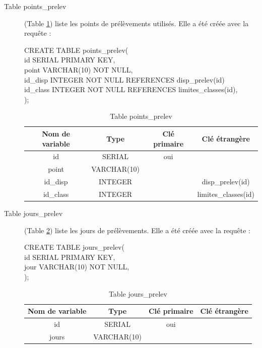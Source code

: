 \documentclass[12pt,a4paper,oneside]{article}
\begin{document}
\begin{description}
\item[Table points\_prelev] (Table \ref{points}) liste les points de prélèvements utilisés. Elle a été créée avec la requête :
\begin{tabbing}
CREATE TABLE points\_prelev(\\
id SERIAL PRIMARY KEY,\\
point VARCHAR(10) NOT NULL,\\
id\_disp INTEGER NOT NULL REFERENCES disp\_prelev(id)\\
id\_class INTEGER NOT NULL REFERENCES limites\_classes(id),\\
);
\end{tabbing}
\begin{table}
\caption{Table points\_prelev \label{points}}
\begin{center}
\begin{tabular}{|c|c|c|c|}
	\hline
	\textbf{Nom de variable} & \textbf{Type} & \textbf{Clé primaire} & \textbf{Clé étrangère}\\
	\hline
	id & SERIAL & oui &\\
	point & VARCHAR(10)& &\\
	id\_disp & INTEGER & & disp\_prelev(id)\\
	id\_class & INTEGER & & limites\_classes(id)\\
	\hline
\end{tabular}
\end{center}
\end{table}

\item[Table jours\_prelev] (Table \ref{jours}) liste les jours de prélèvements. Elle a été créée avec la requête :
\begin{tabbing}
CREATE TABLE jours\_prelev(\\
id SERIAL PRIMARY KEY,\\
jour VARCHAR(10) NOT NULL,\\
);
\end{tabbing}
\begin{table}
\caption{Table jours\_prelev \label{jours}}
\begin{center}
\begin{tabular}{|c|c|c|c|}
	\hline
	\textbf{Nom de variable} & \textbf{Type} & \textbf{Clé primaire} & \textbf{Clé étrangère}\\
	\hline
	id & SERIAL & oui &\\
	jours & VARCHAR(10)& &\\
	\hline
\end{tabular}
\end{center}
\end{table}



\end{description}
\end{document}
